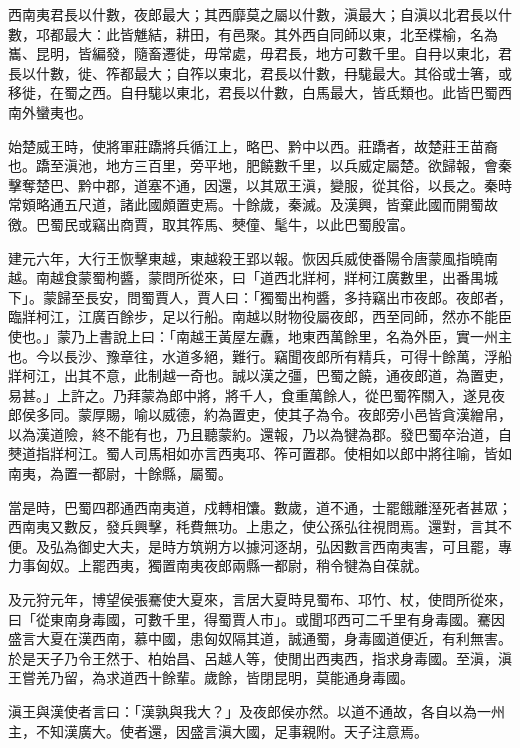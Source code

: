 
\begin{pinyinscope}
西南夷君長以什數，夜郎最大；其西靡莫之屬以什數，滇最大；自滇以北君長以什數，邛都最大：此皆魋結，耕田，有邑聚。其外西自同師以東，北至楪榆，名為巂、昆明，皆編發，隨畜遷徙，毋常處，毋君長，地方可數千里。自冄以東北，君長以什數，徙、筰都最大；自筰以東北，君長以什數，冄駹最大。其俗或士箸，或移徙，在蜀之西。自冄駹以東北，君長以什數，白馬最大，皆氐類也。此皆巴蜀西南外蠻夷也。

始楚威王時，使將軍莊蹻將兵循江上，略巴、黔中以西。莊蹻者，故楚莊王苗裔也。蹻至滇池，地方三百里，旁平地，肥饒數千里，以兵威定屬楚。欲歸報，會秦擊奪楚巴、黔中郡，道塞不通，因還，以其眾王滇，變服，從其俗，以長之。秦時常頞略通五尺道，諸此國頗置吏焉。十餘歲，秦滅。及漢興，皆棄此國而開蜀故徼。巴蜀民或竊出商賈，取其筰馬、僰僮、髦牛，以此巴蜀殷富。

建元六年，大行王恢擊東越，東越殺王郢以報。恢因兵威使番陽令唐蒙風指曉南越。南越食蒙蜀枸醬，蒙問所從來，曰「道西北牂柯，牂柯江廣數里，出番禺城下」。蒙歸至長安，問蜀賈人，賈人曰：「獨蜀出枸醬，多持竊出市夜郎。夜郎者，臨牂柯江，江廣百餘步，足以行船。南越以財物役屬夜郎，西至同師，然亦不能臣使也。」蒙乃上書說上曰：「南越王黃屋左纛，地東西萬餘里，名為外臣，實一州主也。今以長沙、豫章往，水道多絕，難行。竊聞夜郎所有精兵，可得十餘萬，浮船牂柯江，出其不意，此制越一奇也。誠以漢之彊，巴蜀之饒，通夜郎道，為置吏，易甚。」上許之。乃拜蒙為郎中將，將千人，食重萬餘人，從巴蜀筰關入，遂見夜郎侯多同。蒙厚賜，喻以威德，約為置吏，使其子為令。夜郎旁小邑皆貪漢繒帛，以為漢道險，終不能有也，乃且聽蒙約。還報，乃以為犍為郡。發巴蜀卒治道，自僰道指牂柯江。蜀人司馬相如亦言西夷邛、筰可置郡。使相如以郎中將往喻，皆如南夷，為置一都尉，十餘縣，屬蜀。

當是時，巴蜀四郡通西南夷道，戍轉相馕。數歲，道不通，士罷餓離溼死者甚眾；西南夷又數反，發兵興擊，秏費無功。上患之，使公孫弘往視問焉。還對，言其不便。及弘為御史大夫，是時方筑朔方以據河逐胡，弘因數言西南夷害，可且罷，專力事匈奴。上罷西夷，獨置南夷夜郎兩縣一都尉，稍令犍為自葆就。

及元狩元年，博望侯張騫使大夏來，言居大夏時見蜀布、邛竹、杖，使問所從來，曰「從東南身毒國，可數千里，得蜀賈人市」。或聞邛西可二千里有身毒國。騫因盛言大夏在漢西南，慕中國，患匈奴隔其道，誠通蜀，身毒國道便近，有利無害。於是天子乃令王然于、柏始昌、呂越人等，使閒出西夷西，指求身毒國。至滇，滇王嘗羌乃留，為求道西十餘輩。歲餘，皆閉昆明，莫能通身毒國。

滇王與漢使者言曰：「漢孰與我大？」及夜郎侯亦然。以道不通故，各自以為一州主，不知漢廣大。使者還，因盛言滇大國，足事親附。天子注意焉。


\end{pinyinscope}
